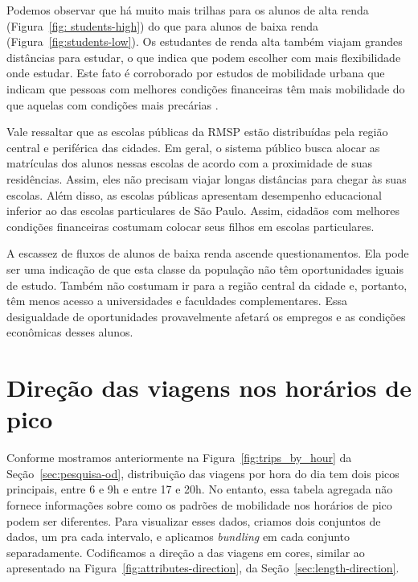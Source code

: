 Podemos observar que há muito mais trilhas para os alunos de alta renda
(Figura~\ref{fig: students-high}) do que para alunos de baixa renda
(Figura~\ref{fig:students-low}). Os estudantes de renda alta também viajam
grandes distâncias para estudar, o que indica que podem escolher com mais
flexibilidade onde estudar. Este fato é corroborado por estudos de mobilidade
urbana que indicam que pessoas com melhores condições financeiras têm mais
mobilidade do que aquelas com condições mais precárias \cite{carruthers2005,
lucas2016}.

Vale ressaltar que as escolas públicas da RMSP estão distribuídas pela região
central e periférica das cidades. Em geral, o sistema público busca alocar as
matrículas dos alunos nessas escolas de acordo com a proximidade de suas
residências. Assim, eles não precisam viajar longas distâncias para chegar às
suas escolas. Além disso, as escolas públicas apresentam desempenho educacional
inferior ao das escolas particulares de São Paulo. Assim, cidadãos com melhores
condições financeiras costumam colocar seus filhos em escolas particulares.

A escassez de fluxos de alunos de baixa renda ascende questionamentos. Ela pode
ser uma indicação de que esta classe da população não têm oportunidades iguais
de estudo. Também não costumam ir para a região central da cidade e, portanto,
têm menos acesso a universidades e faculdades complementares. Essa desigualdade
de oportunidades provavelmente afetará os empregos e as condições econômicas
desses alunos.

\section{Direção das viagens nos horários de pico}
\label{sec:peak-hours}

Conforme mostramos anteriormente na Figura~\ref{fig:trips_by_hour} da
Seção~\ref{sec:pesquisa-od}, distribuição das viagens por hora do dia tem dois picos
principais, entre 6 e 9h e entre 17 e 20h. No entanto, essa tabela agregada não
fornece informações sobre como os padrões de mobilidade nos horários de pico
podem ser diferentes. Para visualizar esses dados, criamos dois conjuntos de
dados, um pra cada intervalo, e aplicamos \emph{bundling} em cada conjunto
separadamente. Codificamos a direção a das viagens em cores, similar ao
apresentado na Figura~\ref{fig:attributes-direction}, da
Seção~\ref{sec:length-direction}.

